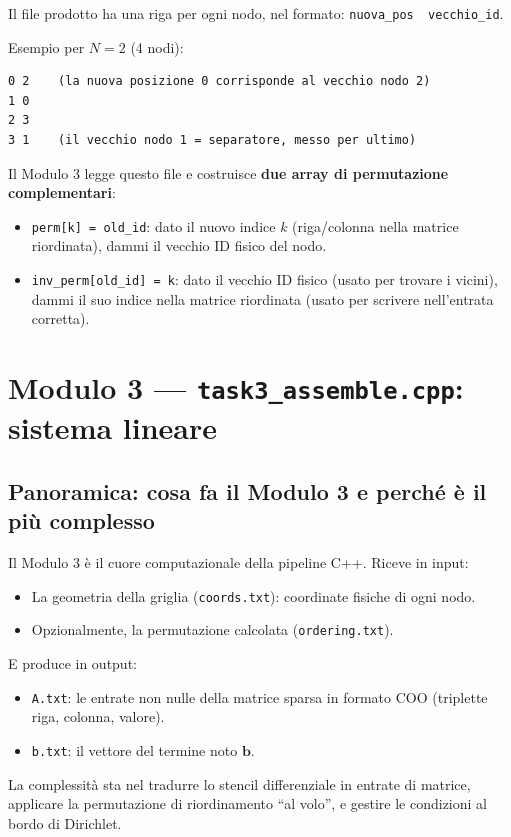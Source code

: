 \documentclass[a4paper,11pt]{article}
\theoremstyle{definition}
\begin{document}
Il file prodotto ha una riga per ogni nodo, nel formato: \texttt{nuova\_pos\ \ vecchio\_id}.\smallskip

Esempio per $N=2$ (4 nodi):
\begin{verbatim}
0 2    (la nuova posizione 0 corrisponde al vecchio nodo 2)
1 0
2 3
3 1    (il vecchio nodo 1 = separatore, messo per ultimo)
\end{verbatim}

Il Modulo 3 legge questo file e costruisce \textbf{due array di permutazione complementari}:
\begin{itemize}
  \item \texttt{perm[k] = old\_id}: dato il nuovo indice $k$ (riga/colonna nella matrice riordinata), dammi il vecchio ID fisico del nodo.
  \item \texttt{inv\_perm[old\_id] = k}: dato il vecchio ID fisico (usato per trovare i vicini), dammi il suo indice nella matrice riordinata (usato per scrivere nell'entrata corretta).
\end{itemize}

\newpage
\section{Modulo 3 — \texttt{task3\_assemble.cpp}: sistema lineare}
\label{sec:modulo3}

\subsection{Panoramica: cosa fa il Modulo 3 e perché è il più complesso}

Il Modulo 3 è il cuore computazionale della pipeline C++. Riceve in input:
\begin{itemize}
  \item La geometria della griglia (\texttt{coords.txt}): coordinate fisiche di ogni nodo.
  \item Opzionalmente, la permutazione calcolata (\texttt{ordering.txt}).
\end{itemize}
E produce in output:
\begin{itemize}
  \item \texttt{A.txt}: le entrate non nulle della matrice sparsa in formato COO (triplette riga, colonna, valore).
  \item \texttt{b.txt}: il vettore del termine noto $\mathbf{b}$.
\end{itemize}
La complessità sta nel tradurre lo stencil differenziale in entrate di matrice, applicare la permutazione di riordinamento ``al volo'', e gestire le condizioni al bordo di Dirichlet.
\end{document}
